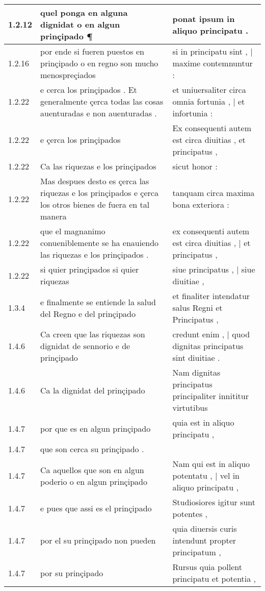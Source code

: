 \begin{tabular}{|p{1cm}|p{6.5cm}|p{6.5cm}|}
1.2.12 & quel ponga en alguna dignidat o en algun prinçipado ¶ & ponat ipsum in aliquo principatu . \\\hline
1.2.16 & por ende si fueren puestos en prinçipado o en regno son mucho menospreçiados & si in principatu sint , | maxime contemnuntur : \\\hline
1.2.22 & e cerca los prinçipados . Et generalmente çerca todas las cosas auenturadas e non auenturadas . & et uniuersaliter circa omnia fortunia , | et infortunia : \\\hline
1.2.22 & e çerca los prinçipados & Ex consequenti autem est circa diuitias , et principatus , \\\hline
1.2.22 & Ca las riquezas e los prinçipados & sicut honor : \\\hline
1.2.22 & Mas despues desto es çerca las riquezas e los prinçipados e çerca los otros bienes de fuera en tal manera & tanquam circa maxima bona exteriora : \\\hline
1.2.22 & que el magnanimo conueniblemente se ha enauiendo las riquezas e los prinçipados . & ex consequenti autem est circa diuitias , | et principatus , \\\hline
1.2.22 & si quier prinçipados si quier riquezas & siue principatus , | siue diuitiae , \\\hline
1.3.4 & e finalmente se entiende la salud del Regno e del prinçipado & et finaliter intendatur salus Regni et Principatus , \\\hline
1.4.6 & Ca creen que las riquezas son dignidat de sennorio e de prinçipado & credunt enim , | quod dignitas principatus sint diuitiae . \\\hline
1.4.6 & Ca la dignidat del prinçipado & Nam dignitas principatus principaliter innititur virtutibus \\\hline
1.4.7 & por que es en algun prinçipado & quia est in aliquo principatu , \\\hline
1.4.7 & que son cerca su prinçipado . &  \\\hline
1.4.7 & Ca aquellos que son en algun poderio o en algun prinçipado & Nam qui est in aliquo potentatu , | vel in aliquo principatu , \\\hline
1.4.7 & e pues que assi es el prinçipado & Studiosiores igitur sunt potentes , \\\hline
1.4.7 & por el su prinçipado non pueden & quia diuersis curis intendunt propter principatum , \\\hline
1.4.7 & por su prinçipado & Rursus quia pollent principatu et potentia , \\\hline

\end{tabular}
